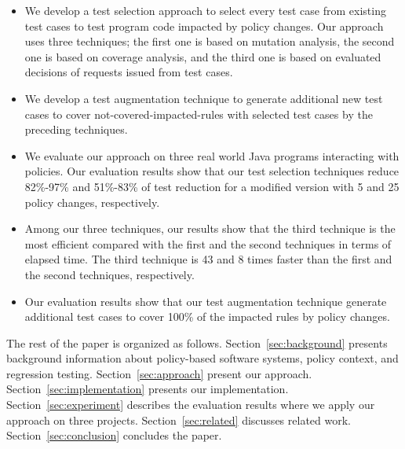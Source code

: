 \begin{itemize}
  \item We develop a test selection approach to select every test case from existing test cases to test program code impacted by policy changes. Our approach
  uses three techniques; the first one is based on mutation analysis, the second one is based on coverage analysis, and the third one is based on evaluated 
decisions of requests issued from test cases. 
  \item We develop a test augmentation technique to generate additional new test cases to cover not-covered-impacted-rules with selected test cases by the preceding techniques.

  \item  We evaluate our approach on three real world Java programs interacting with policies. Our evaluation results show that our test selection techniques reduce 82\%-97\% and 51\%-83\% of test reduction for a modified version with 5 and 25 policy changes, respectively.
  

  \item  Among our three techniques, our results show that the third technique is the most efficient compared with the first
  and the second techniques in terms of elapsed time. The third technique is 43 and 8 times
faster than the first and the second techniques, respectively.
  
  \item    Our evaluation results show that our test augmentation technique generate additional test cases to cover 100\% of the impacted rules by policy changes.
\end{itemize}

The rest of the paper is organized as follows.
Section~\ref{sec:background} presents background information about
policy-based software systems, policy context, and regression testing.
Section~\ref{sec:approach} present our approach.
Section~\ref{sec:implementation} presents our implementation. 
Section~\ref{sec:experiment} describes the evaluation results
where we apply our approach on three projects. 
Section~\ref{sec:related} discusses related
work. Section~\ref{sec:conclusion}
concludes the paper.